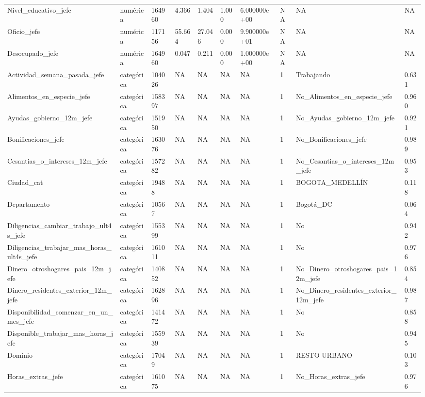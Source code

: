 \begin{longtable}[t]{llllllllll}
Nivel\_educativo\_jefe & numérica & 164960 & 4.366 & 1.404 & 1.000 & 6.000000e+00 & NA & NA & NA\\
Oficio\_jefe & numérica & 117156 & 55.664 & 27.046 & 0.000 & 9.900000e+01 & NA & NA & NA\\
Desocupado\_jefe & numérica & 164960 & 0.047 & 0.211 & 0.000 & 1.000000e+00 & NA & NA & NA\\
Actividad\_semana\_pasada\_jefe & categórica & 104026 & NA & NA & NA & NA & 1 & Trabajando & 0.631\\
Alimentos\_en\_especie\_jefe & categórica & 158397 & NA & NA & NA & NA & 1 & No\_Alimentos\_en\_especie\_jefe & 0.960\\
Ayudas\_gobierno\_12m\_jefe & categórica & 151950 & NA & NA & NA & NA & 1 & No\_Ayudas\_gobierno\_12m\_jefe & 0.921\\
Bonificaciones\_jefe & categórica & 163076 & NA & NA & NA & NA & 1 & No\_Bonificaciones\_jefe & 0.989\\
Cesantias\_o\_intereses\_12m\_jefe & categórica & 157282 & NA & NA & NA & NA & 1 & No\_Cesantias\_o\_intereses\_12m\_jefe & 0.953\\
Ciudad\_cat & categórica & 19488 & NA & NA & NA & NA & 1 & BOGOTA\_MEDELLÍN & 0.118\\
Departamento & categórica & 10567 & NA & NA & NA & NA & 1 & Bogotá\_DC & 0.064\\
Diligencias\_cambiar\_trabajo\_ult4s\_jefe & categórica & 155399 & NA & NA & NA & NA & 1 & No & 0.942\\
Diligencias\_trabajar\_mas\_horas\_ult4s\_jefe & categórica & 161011 & NA & NA & NA & NA & 1 & No & 0.976\\
Dinero\_otroshogares\_pais\_12m\_jefe & categórica & 140852 & NA & NA & NA & NA & 1 & No\_Dinero\_otroshogares\_pais\_12m\_jefe & 0.854\\
Dinero\_residentes\_exterior\_12m\_jefe & categórica & 162896 & NA & NA & NA & NA & 1 & No\_Dinero\_residentes\_exterior\_12m\_jefe & 0.987\\
Disponibilidad\_comenzar\_en\_un\_mes\_jefe & categórica & 141472 & NA & NA & NA & NA & 1 & No & 0.858\\
Disponible\_trabajar\_mas\_horas\_jefe & categórica & 155939 & NA & NA & NA & NA & 1 & No & 0.945\\
Dominio & categórica & 17049 & NA & NA & NA & NA & 1 & RESTO URBANO & 0.103\\
Horas\_extras\_jefe & categórica & 161075 & NA & NA & NA & NA & 1 & No\_Horas\_extras\_jefe & 0.976\\

\end{longtable}
